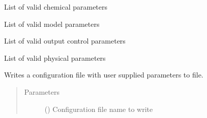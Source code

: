 \documentclass[letterpaper,10pt,english]{sphinxmanual}
\begin{document}
\begin{fulllineitems}

\begin{fulllineitems}
\label{\detokenize{index:lb_colloids.Colloids.Colloid_IO.ColloidsConfig.valid_chemical_parameters}}
List of valid chemical parameters

\end{fulllineitems}


\begin{fulllineitems}
\label{\detokenize{index:lb_colloids.Colloids.Colloid_IO.ColloidsConfig.valid_model_parameters}}
List of valid model parameters

\end{fulllineitems}


\begin{fulllineitems}
\label{\detokenize{index:lb_colloids.Colloids.Colloid_IO.ColloidsConfig.valid_output_control_parameters}}
List of valid output control parameters

\end{fulllineitems}


\begin{fulllineitems}
\label{\detokenize{index:lb_colloids.Colloids.Colloid_IO.ColloidsConfig.valid_physical_parameters}}
List of valid physical parameters

\end{fulllineitems}


\begin{fulllineitems}
\label{\detokenize{index:lb_colloids.Colloids.Colloid_IO.ColloidsConfig.write}}
Writes a configuration file with user supplied parameters to file.
\begin{quote}\begin{description}
\item[{Parameters}] \leavevmode
{} () \textendash{} Configuration file name to write

\end{description}\end{quote}

\end{fulllineitems}


\end{fulllineitems}
\end{document}
